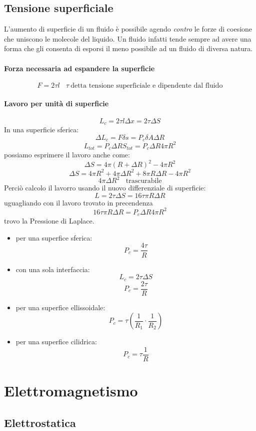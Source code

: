 \documentclass[12pt]{article}
\begin{document}
    \subsection{Tensione superficiale}
    L'aumento di superficie di un fluido è possibile agendo \emph{contro} le forze di coesione che 
    uniscono le molecole del liquido. Un fluido infatti tende sempre ad avere una forma che gli consenta di
    esporsi il meno possibile ad un fluido di diversa natura.
    \paragraph*{Forza necessaria ad espandere la superficie}
    \[F = 2\tau l \:\:\:\:\tau \: \text{detta tensione superficiale e dipendente dal fluido}\]
    \paragraph*{Lavoro per unità di superficie}
    \[L_c = 2\tau l \Delta x = 2 \tau \Delta S\]
    In una superficie sferica:
    \[\Delta L_c = F\delta s = P_c \delta A \Delta R\]
    \[L_{tot} = P_c \Delta R S_{tot} = P_c \Delta R 4\pi R^2\]
    possiamo esprimere il lavoro anche come:
    \[\Delta S = 4\pi (R + \Delta R)^2 - 4\pi R^2\]
    \[\Delta S = 4\pi R^2 + 4\pi \Delta R^2 + 8\pi R\Delta R - 4\pi R^2\]
    \[4\pi \Delta R^2 \:\:\:\: \text{trascurabile}\]
    Perciò calcolo il lavorro usando il nuovo differenziale di superficie:
    \[L = 2 \tau \Delta S = 16 \tau\pi R \Delta R\]
    uguagliando con il lavoro trovato in precendenza
    \[16 \tau\pi R \Delta R =  P_c \Delta R 4\pi R^2\]
    trovo la Pressione di Laplace.
    \begin{itemize}
    \item per una superfice sferica:
    \[P_c = \frac{4\tau}{R}\]
    \item con una sola interfaccia:
    \[L_c = 2 \tau \Delta S\]
    \[P_c = \frac{2\tau}{R}\]
    \item per una superfice ellissoidale:
    \[P_c = \tau(\frac{1}{R_1}\cdot\frac{1}{R_2})\]
    \item per una superfice cilidrica:
    \[P_c = \tau\frac{1}{R}\]
    \end{itemize}
    \section{Elettromagnetismo}
    \subsection{Elettrostatica}
\end{document}
